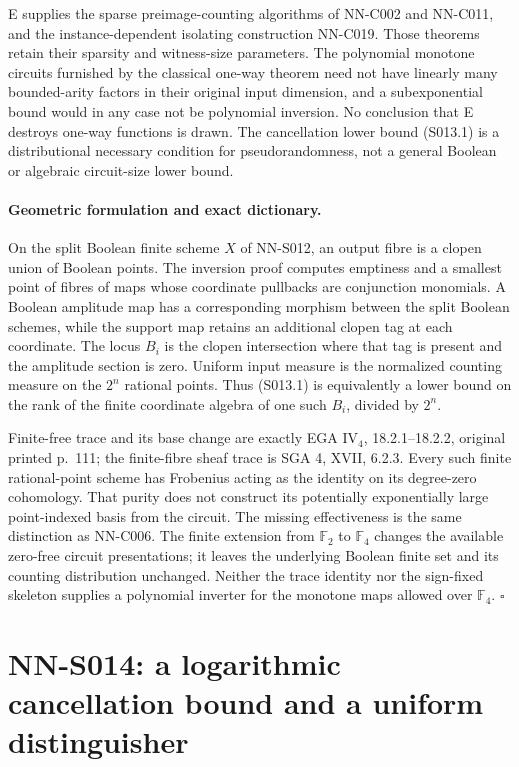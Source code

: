 E supplies the sparse preimage-counting algorithms of NN-C002 and
NN-C011, and the instance-dependent isolating construction NN-C019.
Those theorems retain their sparsity and witness-size parameters.
The polynomial monotone circuits furnished by the classical one-way
theorem need not have linearly many bounded-arity factors in their
original input dimension, and a subexponential bound would in any
case not be polynomial inversion. No conclusion that E destroys
one-way functions is drawn. The cancellation lower bound (S013.1)
is a distributional necessary condition for pseudorandomness, not a
general Boolean or algebraic circuit-size lower bound.

\paragraph{Geometric formulation and exact dictionary.}
On the split Boolean finite scheme $X$ of NN-S012, an output fibre
is a clopen union of Boolean points. The inversion proof computes
emptiness and a smallest point of fibres of maps whose coordinate
pullbacks are conjunction monomials. A Boolean amplitude map has
a corresponding morphism between the split Boolean schemes, while
the support map retains an additional clopen tag at each coordinate.
The locus $B_i$ is the clopen intersection where that tag is present
and the amplitude section is zero. Uniform input measure is the
normalized counting measure on the $2^n$ rational points. Thus
(S013.1) is equivalently a lower bound on the rank of the finite
coordinate algebra of one such $B_i$, divided by $2^n$.

Finite-free trace and its base change are exactly EGA IV$_4$,
18.2.1--18.2.2, original printed p.~111; the finite-fibre sheaf trace
is SGA 4, XVII, 6.2.3. Every such finite rational-point scheme has
Frobenius acting as the identity on its degree-zero cohomology.
That purity does not construct its potentially exponentially large
point-indexed basis from the circuit. The missing effectiveness is
the same distinction as NN-C006. The finite extension from
$\mathbb F_2$ to $\mathbb F_4$ changes the available zero-free circuit
presentations; it leaves the underlying Boolean finite set and its
counting distribution unchanged. Neither the trace identity nor
the sign-fixed skeleton supplies a polynomial inverter for the
monotone maps allowed over $\mathbb F_4$.
\hfill$\square$


\section{NN-S014: a logarithmic cancellation bound and a uniform distinguisher}

